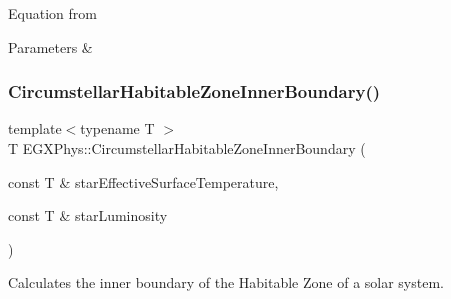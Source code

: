 Equation from 
\begin{DoxyParams}{Parameters}
{\em } & \\
\hline
\end{DoxyParams}
\mbox{\label{group___astrophysics_ga9ee2e8023cb444aa4638c962788b5853}} 
\subsubsection{\texorpdfstring{Circumstellar\+Habitable\+Zone\+Inner\+Boundary()}{CircumstellarHabitableZoneInnerBoundary()}}
{\footnotesize\ttfamily template$<$typename T $>$ \\
T E\+G\+X\+Phys\+::\+Circumstellar\+Habitable\+Zone\+Inner\+Boundary (\begin{DoxyParamCaption}\item[{const T \&}]{star\+Effective\+Surface\+Temperature,  }\item[{const T \&}]{star\+Luminosity }\end{DoxyParamCaption})}



Calculates the inner boundary of the Habitable Zone of a solar system. 

